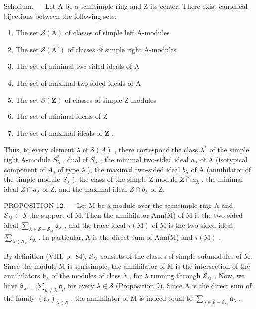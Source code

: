 Scholium. --- Let A be a semisimple ring and Z its center. There exist canonical bijections between the following sets:

\begin{enumerate}
\def\labelenumi{\alph{enumi})}
\item
  The set \(\mathcal{S}(\mathrm{A})\) of classes of simple left A-modules
\item
  The set \(\mathcal{S}(\mathrm{A}^{\circ})\) of classes of simple right A-modules
\item
  The set of minimal two-sided ideals of A
\item
  The set of maximal two-sided ideals of A
\item
  The set \(\mathcal{S}(\mathbf{Z})\) of classes of simple Z-modules
\item
  The set of minimal ideals of Z
\item
  The set of maximal ideals of \(\mathbf{Z}\) .
\end{enumerate}

Thus, to every element \(\lambda\) of \(\mathcal{S}(A)\) , there correspond the class \(\lambda^{*}\) of the simple right A-module \(S_{\lambda}^{*}\) , dual of \(S_{\lambda}\) , the minimal two-sided ideal \(a_{\lambda}\) of A (isotypical component of \(A_{s}\) of type \(\lambda\) ), the maximal two-sided ideal \(b_{\lambda}\) of A (annihilator of the simple module \(S_{\lambda}\) ), the class of the simple Z-module \(Z \cap a_{\lambda}\) , the minimal ideal \(Z \cap a_{\lambda}\) of Z, and the maximal ideal \(Z \cap b_{\lambda}\) of Z.

PROPOSITION 12. --- Let M be a module over the semisimple ring A and \(\mathcal{S}_{\mathrm{M}} \subset \mathcal{S}\) the support of M. Then the annihilator Ann(M) of M is the two-sided ideal \(\sum_{\lambda \in \mathcal{S} - \mathcal{S}_{\mathrm{M}}} \mathfrak{a}_{\lambda}\) , and the trace ideal \(\tau(\mathrm{M})\) of M is the two-sided ideal \(\sum_{\lambda \in \mathcal{S}_{\mathrm{M}}} \mathfrak{a}_{\lambda}\) . In particular, A is the direct sum of Ann(M) and \(\tau(\mathrm{M})\) .

By definition (VIII, p.~84), \(\mathcal{S}_{\mathrm{M}}\) consists of the classes of simple submodules of M. Since the module M is semisimple, the annihilator of M is the intersection of the annihilators \(\mathfrak{b}_{\lambda}\) of the modules of class \(\lambda\) , for \(\lambda\) running through \(\mathcal{S}_{\mathrm{M}}\) . Now, we have \(\mathfrak{b}_{\lambda} = \sum_{\mu \neq \lambda} \mathfrak{a}_{\mu}\) for every \(\lambda \in \mathcal{S}\) (Proposition 9). Since A is the direct sum of the family \((\mathfrak{a}_{\lambda})_{\lambda \in \mathcal{S}}\) , the annihilator of M is indeed equal to \(\sum_{\lambda \in \mathcal{S} - \mathcal{S}_{\mathrm{M}}} \mathfrak{a}_{\lambda}\) .

